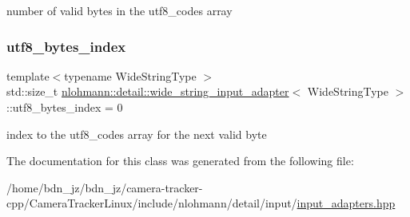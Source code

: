 number of valid bytes in the utf8\+\_\+codes array 

\mbox{\label{classnlohmann_1_1detail_1_1wide__string__input__adapter_a6d87bc3e8b427e06cda936383283e0c4}} 
\subsubsection{\texorpdfstring{utf8\+\_\+bytes\+\_\+index}{utf8\_bytes\_index}}
{\footnotesize\ttfamily template$<$typename Wide\+String\+Type $>$ \\
std\+::size\+\_\+t \hyperlink{classnlohmann_1_1detail_1_1wide__string__input__adapter}{nlohmann\+::detail\+::wide\+\_\+string\+\_\+input\+\_\+adapter}$<$ Wide\+String\+Type $>$\+::utf8\+\_\+bytes\+\_\+index = 0\hspace{0.3cm}{\ttfamily [private]}}



index to the utf8\+\_\+codes array for the next valid byte 



The documentation for this class was generated from the following file\+:\begin{DoxyCompactItemize}
\item 
/home/bdn\+\_\+jz/bdn\+\_\+jz/camera-\/tracker-\/cpp/\+Camera\+Tracker\+Linux/include/nlohmann/detail/input/\hyperlink{input__adapters_8hpp}{input\+\_\+adapters.\+hpp}\end{DoxyCompactItemize}
